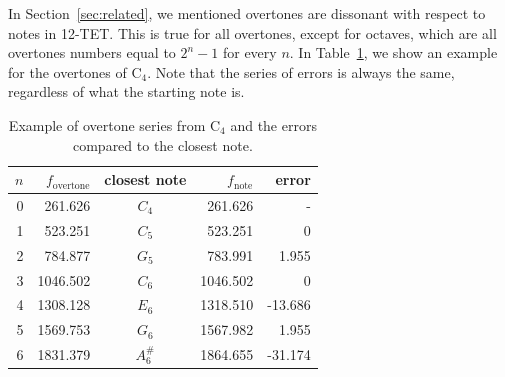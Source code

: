 \documentclass[a4paper,10pt,twocolumn]{article}
\newcommand{\note}[2]{#1${}_{#2}$}
\begin{document}
In Section~\ref{sec:related}, we mentioned overtones are dissonant with respect to notes in 12-TET. This is true for all overtones, except for octaves, which are all overtones numbers equal to $2^n - 1$ for every $n$. In Table~\ref{tab:overseries}, we show an example for the overtones of \note{C}{4}. Note that the series of errors is always the same, regardless of what the starting note is. 
\begin{table}[h]
    \centering
    \begin{tabular}{rrcrr}
        $n$ & $f_{\text{overtone}}$ & closest note & $f_\text{note}$ & error \\
        \hline
        0 & 261.626  & $C_4$    & 261.626  &  - \\
        1 & 523.251  & $C_5$    & 523.251  &  0 \\
        2 & 784.877  & $G_5$    & 783.991  &  1.955 \\
        3 & 1046.502 & $C_6$    & 1046.502 &  0 \\
        4 & 1308.128 & $E_6$    & 1318.510 &  -13.686 \\
        5 & 1569.753 & $G_6$    & 1567.982 &  1.955 \\
        6 & 1831.379 & $A^\#_6$ & 1864.655 &  -31.174
    \end{tabular}
    \caption{Example of overtone series from \note{C}{4} and the errors compared to the closest note.}
    \label{tab:overseries}
\end{table}

\end{document}
